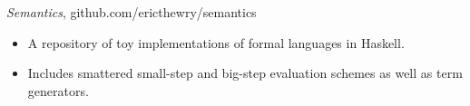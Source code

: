 {\sl Semantics}, github.com/ericthewry/semantics
\begin{itemize} \itemsep -2pt
  \item A repository of toy implementations of formal languages in
    Haskell.
  \item Includes smattered small-step and big-step evaluation schemes
    as well as term generators.
\end{itemize}
